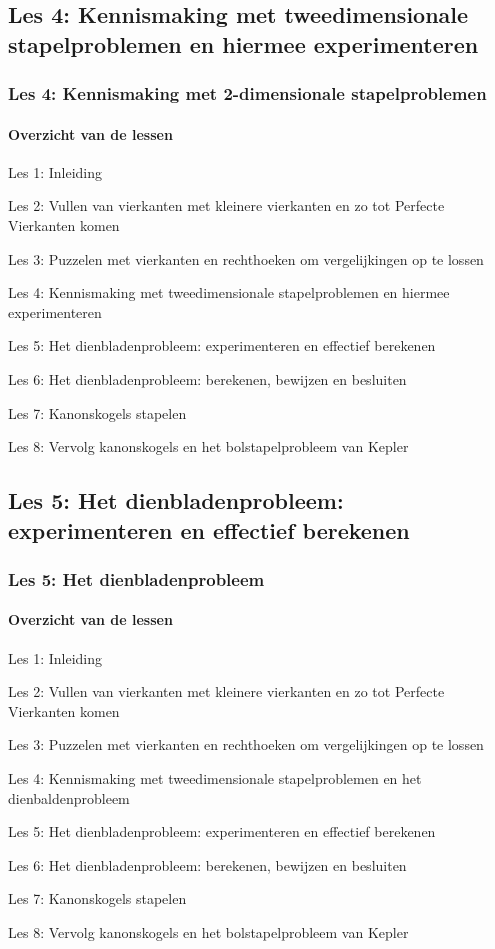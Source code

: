 \documentclass[dutch]{beamer}
\begin{document}
\subsection{Les 4: Kennismaking met tweedimensionale stapelproblemen en hiermee experimenteren}
\begin{frame}
\frametitle{Les 4: Kennismaking met 2-dimensionale stapelproblemen}
\framesubtitle{Overzicht van de lessen}
\begin{list}{\quad}{}
\item Les 1: Inleiding
\item Les 2: Vullen van vierkanten met kleinere vierkanten en zo tot Perfecte Vierkanten komen
\item Les 3: Puzzelen met vierkanten en rechthoeken om vergelijkingen op te lossen
\item {\color{blue}Les 4: Kennismaking met tweedimensionale stapelproblemen en hiermee experimenteren}
\item Les 5: Het dienbladenprobleem: experimenteren en effectief berekenen
\item Les 6: Het dienbladenprobleem: berekenen, bewijzen en besluiten
\item Les 7: Kanonskogels stapelen
\item Les 8: Vervolg kanonskogels en het bolstapelprobleem van Kepler
\end{list}
\end{frame}

\subsection{Les 5: Het dienbladenprobleem: experimenteren en effectief berekenen}
\begin{frame}
\frametitle{Les 5: Het dienbladenprobleem}
\framesubtitle{Overzicht van de lessen}
\begin{list}{\quad}{}
\item Les 1: Inleiding
\item Les 2: Vullen van vierkanten met kleinere vierkanten en zo tot Perfecte Vierkanten komen
\item Les 3: Puzzelen met vierkanten en rechthoeken om vergelijkingen op te lossen
\item Les 4: Kennismaking met tweedimensionale stapelproblemen en het dienbaldenprobleem 
\item {\color{blue}Les 5: Het dienbladenprobleem: experimenteren en effectief berekenen}
\item Les 6: Het dienbladenprobleem: berekenen, bewijzen en besluiten
\item Les 7: Kanonskogels stapelen
\item Les 8: Vervolg kanonskogels en het bolstapelprobleem van Kepler
\end{list}
\end{frame}
\end{document}
